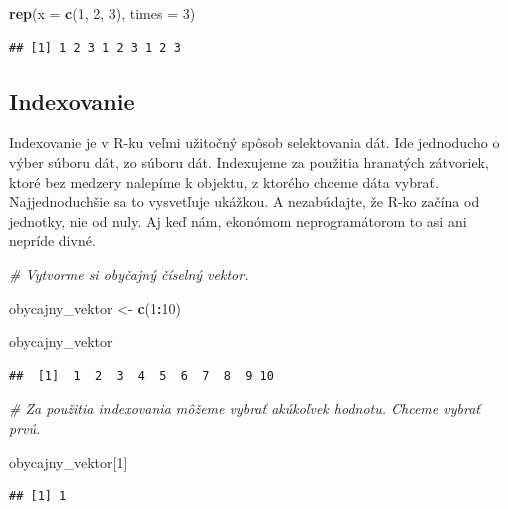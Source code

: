 \documentclass[]{article}
\newenvironment{Shaded}{\begin{snugshade}}{\end{snugshade}}
\newcommand{\CommentTok}[1]{\textcolor[rgb]{0.56,0.35,0.01}{\textit{#1}}}
\newcommand{\DataTypeTok}[1]{\textcolor[rgb]{0.13,0.29,0.53}{#1}}
\newcommand{\DecValTok}[1]{\textcolor[rgb]{0.00,0.00,0.81}{#1}}
\newcommand{\KeywordTok}[1]{\textcolor[rgb]{0.13,0.29,0.53}{\textbf{#1}}}
\newcommand{\NormalTok}[1]{#1}
\newcommand{\OperatorTok}[1]{\textcolor[rgb]{0.81,0.36,0.00}{\textbf{#1}}}
\newcommand{\StringTok}[1]{\textcolor[rgb]{0.31,0.60,0.02}{#1}}
\begin{document}
\begin{Shaded}
\begin{Highlighting}[]
\KeywordTok{rep}\NormalTok{(}\DataTypeTok{x =} \KeywordTok{c}\NormalTok{(}\DecValTok{1}\NormalTok{, }\DecValTok{2}\NormalTok{, }\DecValTok{3}\NormalTok{), }\DataTypeTok{times =} \DecValTok{3}\NormalTok{)}
\end{Highlighting}
\end{Shaded}

\begin{verbatim}
## [1] 1 2 3 1 2 3 1 2 3
\end{verbatim}

\hypertarget{indexovanie}{%
\subsection{Indexovanie}\label{indexovanie}}

Indexovanie je v R-ku veľmi užitočný spôsob selektovania dát. Ide
jednoducho o výber súboru dát, zo súboru dát. Indexujeme za použitia
hranatých zátvoriek, ktoré bez medzery nalepíme k objektu, z ktorého
chceme dáta vybrať. Najjednoduchšie sa to vysvetľuje ukážkou. A
nezabúdajte, že R-ko začína od jednotky, nie od nuly. Aj keď nám,
ekonómom neprogramátorom to asi ani nepríde divné.

\begin{Shaded}
\begin{Highlighting}[]
\CommentTok{# Vytvorme si obyčajný číselný vektor.}

\NormalTok{obycajny_vektor <-}\StringTok{ }\KeywordTok{c}\NormalTok{(}\DecValTok{1}\OperatorTok{:}\DecValTok{10}\NormalTok{)}

\NormalTok{obycajny_vektor}
\end{Highlighting}
\end{Shaded}

\begin{verbatim}
##  [1]  1  2  3  4  5  6  7  8  9 10
\end{verbatim}

\begin{Shaded}
\begin{Highlighting}[]
\CommentTok{# Za použitia indexovania môžeme vybrať akúkoľvek hodnotu. Chceme vybrať prvú.}

\NormalTok{obycajny_vektor[}\DecValTok{1}\NormalTok{]}
\end{Highlighting}
\end{Shaded}

\begin{verbatim}
## [1] 1
\end{verbatim}
\end{document}
